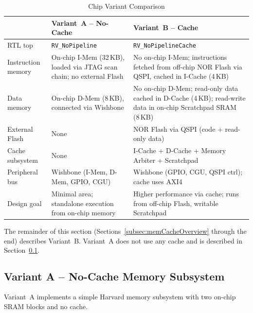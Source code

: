 \begin{table}[H]
\caption{Chip Variant Comparison}
\label{tab:asChipVariants}
\centering
\begin{tabularx}{\textwidth}{|l |X |X|}
  \hline
   & \textbf{Variant~A -- No-Cache} & \textbf{Variant~B -- Cache} \\
  \hline
  \hline
  RTL top & \texttt{RV\_NoPipeline} & \texttt{RV\_NoPipelineCache} \\
  \hline
  Instruction memory
    & On-chip I-Mem (32\,KB), loaded via JTAG scan chain; no external Flash
    & No on-chip I-Mem; instructions fetched from off-chip NOR Flash via QSPI, cached in I-Cache (4\,KB) \\
  \hline
  Data memory
    & On-chip D-Mem (8\,KB), connected via Wishbone
    & No on-chip D-Mem; read-only data cached in D-Cache (4\,KB); read-write data in on-chip Scratchpad SRAM (8\,KB) \\
  \hline
  External Flash
    & None
    & NOR Flash via QSPI (code + read-only data) \\
  \hline
  Cache subsystem
    & None
    & I-Cache + D-Cache + Memory Arbiter + Scratchpad \\
  \hline
  Peripheral bus
    & Wishbone (I-Mem, D-Mem, GPIO, CGU)
    & Wishbone (GPIO, CGU, QSPI ctrl); cache uses AXI4 \\
  \hline
  Design goal
    & Minimal area; standalone execution from on-chip memory
    & Higher performance via cache; runs from off-chip Flash, writable Scratchpad \\
  \hline
\end{tabularx}
\end{table}

\noindent
The remainder of this section (Sections~\ref{subsec:memCacheOverview}
through the end) describes Variant~B.
Variant~A does not use any cache and is described in
Section~\ref{subsec:noCacheVariant}.

\subsection{Variant A -- No-Cache Memory Subsystem}
\label{subsec:noCacheVariant}

Variant~A implements a simple Harvard memory subsystem with two on-chip SRAM
blocks and no cache.

